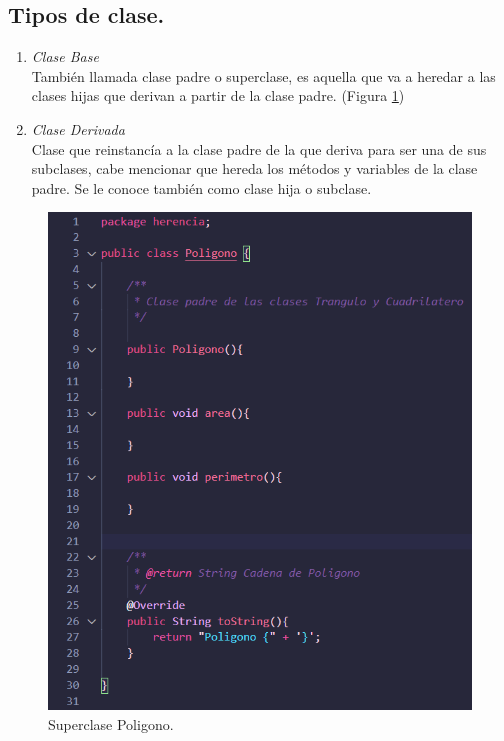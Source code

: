 \documentclass[conference]{IEEEtran}
\begin{document}
        \subsection{Tipos de clase.}

        \begin{enumerate}    
            \item \textit{Clase Base}\\
                También llamada clase padre o superclase, es aquella que va a heredar a las clases hijas que derivan a partir de la clase padre. (Figura \ref{fig1})
            \item \textit{Clase Derivada}\\
                Clase que reinstancía a la clase padre de la que deriva para ser una de sus subclases, cabe mencionar que hereda los métodos y variables de la clase padre.
                Se le conoce también como clase hija o subclase.
        \end{enumerate}
        
        \begin{figure}[htbp]
            \centerline{\includegraphics[scale=0.3]{./pics/2}}
            \caption{Superclase Poligono.}
            \label{fig1}
        \end{figure}
\end{document}
